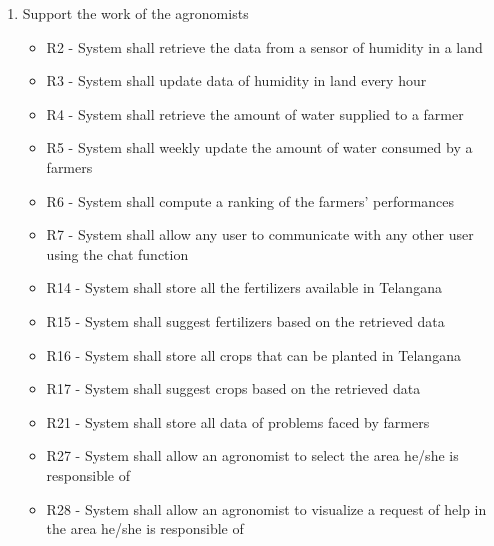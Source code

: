 \begin{enumerate}[label=\textbf{G.\arabic*}]
\begin{enumerate} [label=\textbf{G.4.\arabic*}]
\begin{itemize} [label =]
            \item DA22 - The lands are measured in acres
            \item DA23 - All the users know their credentials given by Telangana state
            \item DA24 - Any user knows the correct username he/she wants to contact using “Chat”
            \item DA25 - All the users do not forget their credentials given by Telangana state
            \item DA26 - Each farmer is associated with only one farm
            \item DA27 - Every farmer stays in the same location
        \end{itemize}
        \item Support the work of the agronomists
        \begin{itemize} [label =]
            \item R2 - System shall retrieve the data from a sensor of humidity in a land
            \item R3 - System shall update data of humidity in land every hour
            \item R4 - System shall retrieve the amount of water supplied to a farmer
            \item R5 - System shall weekly update the amount of water consumed by a farmers 
            \item R6 - System shall compute a ranking of the farmers’ performances
            \item R7 - System shall allow any user to communicate with any other user using the chat function
            \item R14 - System shall store all the fertilizers available in Telangana
            \item R15 - System shall suggest fertilizers based on the retrieved data
            \item R16 - System shall store all crops that can be planted in Telangana
            \item R17 - System shall suggest crops based on the retrieved data
            \item R21 - System shall store all data of problems faced by farmers
            \item R27 - System shall allow an agronomist to select the area he/she is responsible of
            \item R28 - System shall allow an agronomist to visualize a request of help in the area he/she is responsible of

\end{itemize}
\end{enumerate}
\end{enumerate}
